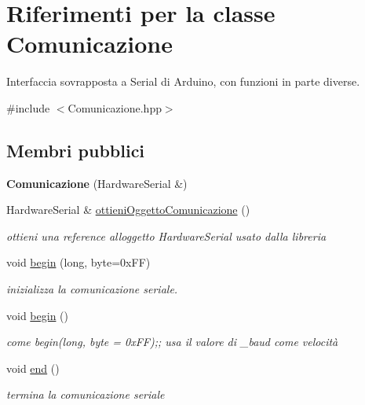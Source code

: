 \hypertarget{class_comunicazione}{}\section{Riferimenti per la classe Comunicazione}
\label{class_comunicazione}


Interfaccia sovrapposta a Serial di Arduino, con funzioni in parte diverse.  




{\ttfamily \#include $<$Comunicazione.\+hpp$>$}

\subsection*{Membri pubblici}
\begin{DoxyCompactItemize}
\item 
\mbox{\label{class_comunicazione_a8baed71554d6d63fba57015d2f08ae35}} 
{\bfseries Comunicazione} (Hardware\+Serial \&)
\item 
Hardware\+Serial \& \hyperlink{class_comunicazione_ad06d143e6030e8acd1c8f654bf5e961f}{ottieni\+Oggetto\+Comunicazione} ()
\begin{DoxyCompactList}\small\item\em ottieni una reference all\textquotesingle{}oggetto Hardware\+Serial usato dalla libreria \end{DoxyCompactList}\item 
void \hyperlink{class_comunicazione_ab8be3e3473b5cb78466f732475c62658}{begin} (long, byte=0x\+F\+F)
\begin{DoxyCompactList}\small\item\em inizializza la comunicazione seriale. \end{DoxyCompactList}\item 
void \hyperlink{class_comunicazione_a186ab1065f1bdc50f59c19d401634d2f}{begin} ()
\begin{DoxyCompactList}\small\item\em come {\ttfamily begin(long, byte = 0x\+FF);}; usa il valore di {\ttfamily \+\_\+baud} come velocità \end{DoxyCompactList}\item 
void \hyperlink{class_comunicazione_a1c97e95cbc279dd897fac5296250d2f5}{end} ()
\begin{DoxyCompactList}\small\item\em termina la comunicazione seriale \end{DoxyCompactList}\item 

\end{DoxyCompactItemize}
